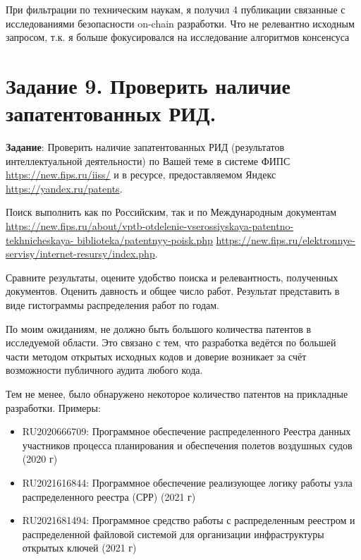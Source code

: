 \documentclass[a4paper, 12pt]{report}		%
\begin{document}
При фильтрации по техническим наукам, я получил 4 публикации связанные с исследованиями безопасности on-chain разработки. Что не релевантно исходным запросом, т.к. я больше фокусировался на исследование алгоритмов консенсуса



\chapter*{Задание 9. Проверить наличие запатентованных РИД.}


\textbf{Задание}: Проверить наличие запатентованных РИД (результатов интеллектуальной деятельности) по Вашей теме в системе ФИПС \url{https://new.fips.ru/iiss/} и в ресурсе, предоставляемом Яндекс \url{https://yandex.ru/patents}.


Поиск выполнить как по Российским, так и по Международным документам \url{https://new.fips.ru/about/vptb-otdelenie-vserossiyskaya-patentno-tekhnicheskaya-
biblioteka/patentnyy-poisk.php} \url{https://new.fips.ru/elektronnye-servisy/internet-resursy/index.php}.


Сравните результаты, оцените удобство поиска и релевантность, полученных документов. Оценить давность и общее число работ. Результат представить в виде гистограммы распределения работ по годам.


\vspace{1cm}


По моим ожиданиям, не должно быть большого количества патентов в исследуемой области. Это связано с тем, что разработка ведётся по большей части методом открытых исходных кодов и доверие возникает за счёт возможности публичного аудита любого кода.

Тем не менее, было обнаружено некоторое количество патентов на прикладные разработки. Примеры:
\begin{itemize}
\item RU2020666709: Программное обеспечение распределенного Реестра данных участников процесса планирования и обеспечения полетов воздушных судов (2020 г)
\item RU2021616844: Программное обеспечение реализующее логику работы узла распределенного реестра (СРР) (2021 г)
\item RU2021681494: Программное средство работы с распределенным реестром и распределенной файловой системой для организации инфраструктуры открытых ключей (2021 г)
\end{itemize}
\end{document}
